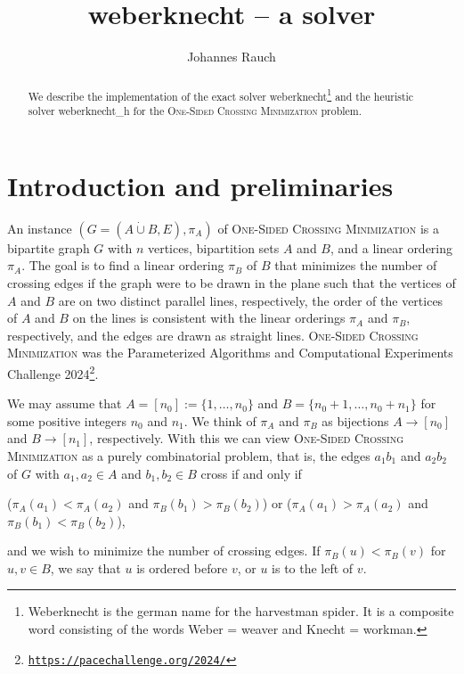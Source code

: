 \documentclass[a4paper,UKenglish,cleveref, autoref, thm-restate]{lipics-v2021}
\title{\textsf{weberknecht} -- a \OSCM{} solver}
\author{Johannes Rauch}
{Ulm University, Institute of Optimization and Operations Research, Germany}
{johannes.rauch@uni-ulm.de}
{https://orcid.org/0000-0002-6925-8830}
{}%
\newcommand{\OSCM}{\textsc{One-Sided Crossing Minimization}}
\begin{document}
\maketitle

\begin{abstract}
We describe the implementation of the exact solver \textsf{weberknecht}\footnote{Weberknecht is the german name for the harvestman spider. It is a composite word consisting of the words Weber = weaver and Knecht = workman. 
} and the heuristic solver \textsf{weberknecht\_h} for the \OSCM{} problem.
\end{abstract}

\section{Introduction and preliminaries}\label{sec:pre}
An instance $(G = (A \dot{\cup} B, E), \pi_A)$ of \OSCM{} is a bipartite graph $G$ with $n$ vertices, bipartition sets $A$ and $B$, and a linear ordering $\pi_A$.
The goal is to find a linear ordering $\pi_B$ of $B$ that minimizes the number of crossing edges if the graph were to be drawn in the plane such that
the vertices of $A$ and $B$ are on two distinct parallel lines, respectively,
the order of the vertices of $A$ and $B$ on the lines is consistent with the linear orderings $\pi_A$ and $\pi_B$, respectively, and
the edges are drawn as straight lines.
\OSCM{} was the Parameterized Algorithms and Computational Experiments Challenge 2024\footnote{\href{https://pacechallenge.org/2024/}{\texttt{https://pacechallenge.org/2024/}}}.

We may assume that $A = [n_0] := \{1, \dots, n_0\}$ and $B = \{n_0 + 1, \dots, n_0 + n_1\}$ for some positive integers $n_0$ and $n_1$.
We think of $\pi_A$ and $\pi_B$ as bijections $A \rightarrow [n_0]$ and $B \rightarrow [n_1]$, respectively.
With this we can view \OSCM{} as a purely combinatorial problem, that is, the edges $a_1b_1$ and $a_2b_2$ of $G$ with $a_1,a_2 \in A$ and $b_1,b_2 \in B$ cross if and only if
\begin{center}
($\pi_A(a_1) < \pi_A(a_2)$ and $\pi_B(b_1) > \pi_B(b_2)$) or ($\pi_A(a_1) > \pi_A(a_2)$ and $\pi_B(b_1) < \pi_B(b_2)$),
\end{center}
and we wish to minimize the number of crossing edges.
If $\pi_B(u) < \pi_B(v)$ for $u, v \in B$, we say that $u$ is ordered before $v$, or $u$ is to the left of $v$.
\end{document}
